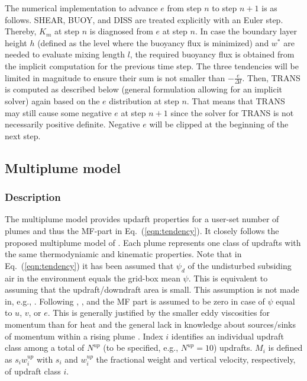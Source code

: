 \documentclass[dvipdfmx,a4paper,10pt]{article}
\begin{document}
The numerical implementation to advance $e$ from step $n$ to step $n+1$ is as follows. SHEAR, BUOY, and DISS are treated explicitly with an Euler step. Thereby, $K_m$ at step $n$ is diagnosed from $e$ at step $n$. In case the boundary layer height $h$ (defined as the level where the buoyancy flux is minimized) and $w^*$ are needed to evaluate mixing length $l$, the required buoyancy flux is obtained from the implicit computation for the previous time step. The three tendencies will be limited in magnitude to ensure their sum is not smaller than $-\frac{e}{\Delta t}$. Then, TRANS is computed as described below (general formulation allowing for an implicit solver) again based on the $e$ distribution at step $n$. That means that TRANS may still cause some negative $e$ at step $n+1$ since the solver for TRANS is not necessarily positive definite. Negative $e$ will be clipped at the beginning of the next step.   

\subsection{Multiplume model}

\subsubsection{Description}

The multiplume model provides updarft properties for a user-set number of plumes and thus the MF-part in Eq.~(\ref{eqn:tendency}). It closely follows the proposed multiplume model of \cite{cheinet03a}. Each plume represents one class of updrafts with the same thermodyniamic and kinematic properties. Note that in Eq.~(\ref{eqn:tendency}) it has been assumed that $\psi_d$ of the undisturbed subsiding air in the environment equals the grid-box mean $\psi$. This is equivalent to assuming that the updraft/downdraft area is small. This assumption is not made in, e.g., \cite{cheinet03a}. Following \cite{suselj12}, \cite{suselj13}, and \cite{suselj14} the MF part is assumed to be zero in case of $\psi$ equal to $u$, $v$, or $e$. This is generally justified by the smaller eddy viscosities for momentum than for heat and the general lack in knowledge about sources/sinks of momentum within a rising plume \citep[see, e.g., discussion in][]{han15}. Index $i$ identifies an individual updraft class among a total of $N^{up}$ (to be specified, e.g., $N^{up}=10$) updrafts. $M_i$ is defined as $s_i w^{up}_i$ with $s_i$ and $w^{up}_i$ the fractional weight and vertical velocity, respectively, of updraft class $i$. 
\end{document}

